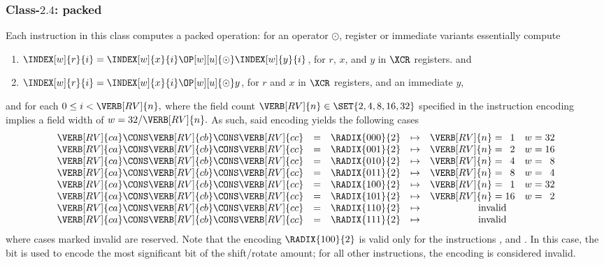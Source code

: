 \subsubsection{Class-$2.4$: packed}
\label{sec:spec:instruction:2:4}

Each instruction in this class computes a packed operation: for an operator
$\odot$, register or immediate variants essentially compute

\begin{enumerate}
\item $\INDEX[w]{r}{i} = \INDEX[w]{x}{i} \OP[w][u]{\odot} \INDEX[w]{y}{i}$,
      for $r$, $x$, and $y$ in $\XCR$ registers.
      and
\item $\INDEX[w]{r}{i} = \INDEX[w]{x}{i} \OP[w][u]{\odot}           y    $,
      for $r$       and $x$ in $\XCR$ registers, and an immediate $y$,
\end{enumerate}

\noindent
and for each 
$
0 \leq i < \VERB[RV]{n} ,
$ 
where the field count
$
\VERB[RV]{n} \in \SET{ 2, 4, 8, 16, 32 }
$ 
specified in the instruction encoding implies a field width of 
$
w = 32 / \VERB[RV]{n} .
$
As such, said encoding yields the following cases
\[
\begin{array}{ccrcc@{\;}c@{\;}rc@{\;}c@{\;}r}
\VERB[RV]{ca} \CONS \VERB[RV]{cb} \CONS \VERB[RV]{cc} &=& \RADIX{000}{2} &\mapsto& \VERB[RV]{n} &=&  1 & w &=& 32     \\
\VERB[RV]{ca} \CONS \VERB[RV]{cb} \CONS \VERB[RV]{cc} &=& \RADIX{001}{2} &\mapsto& \VERB[RV]{n} &=&  2 & w &=& 16     \\
\VERB[RV]{ca} \CONS \VERB[RV]{cb} \CONS \VERB[RV]{cc} &=& \RADIX{010}{2} &\mapsto& \VERB[RV]{n} &=&  4 & w &=&  8     \\
\VERB[RV]{ca} \CONS \VERB[RV]{cb} \CONS \VERB[RV]{cc} &=& \RADIX{011}{2} &\mapsto& \VERB[RV]{n} &=&  8 & w &=&  4     \\
\VERB[RV]{ca} \CONS \VERB[RV]{cb} \CONS \VERB[RV]{cc} &=& \RADIX{100}{2} &\mapsto& \VERB[RV]{n} &=&  1 & w &=& 32     \\
\VERB[RV]{ca} \CONS \VERB[RV]{cb} \CONS \VERB[RV]{cc} &=& \RADIX{101}{2} &\mapsto& \VERB[RV]{n} &=& 16 & w &=&  2     \\
\VERB[RV]{ca} \CONS \VERB[RV]{cb} \CONS \VERB[RV]{cc} &=& \RADIX{110}{2} &\mapsto& \multicolumn{6}{c}{\mbox{invalid}} \\
\VERB[RV]{ca} \CONS \VERB[RV]{cb} \CONS \VERB[RV]{cc} &=& \RADIX{111}{2} &\mapsto& \multicolumn{6}{c}{\mbox{invalid}} \\
\end{array}
\]
where cases marked invalid are reserved.  Note that the encoding 
$
\RADIX{100}{2}
$
is valid only for the instructions
,
 and
.
In this case, the  bit is used to encode the most significant
bit of the shift/rotate amount; for all other instructions, the encoding
is considered invalid.

